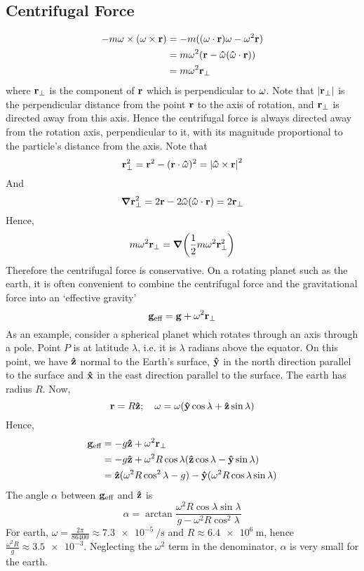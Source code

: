 \documentclass{article}
\begin{document}
\subsection{Centrifugal Force}
\begin{align*}
	-m\vb\omega \times (\vb\omega \times \vb r) & = -m((\vb\omega \cdot \vb r)\vb\omega - \vb\omega^2\vb r) \\
	                                            & = m\omega^2(\vb r - \vu\omega(\vu\omega \cdot \vb r))     \\
	                                            & = m\omega^2 \vb r_\perp
\end{align*}
where $\vb r_\perp$ is the component of $\vb r$ which is perpendicular to $\vb\omega$. Note that $\abs{\vb r_\perp}$ is the perpendicular distance from the point $\vb r$ to the axis of rotation, and $\vb r_\perp$ is directed away from this axis. Hence the centrifugal force is always directed away from the rotation axis, perpendicular to it, with its magnitude proportional to the particle's distance from the axis. Note that
\[ \vb r_\perp^2 = \vb r^2 - (\vb r \cdot \vu\omega)^2 = \abs{\vu\omega \times \vb r}^2 \]
And
\[ \grad \vb r_\perp^2 = 2\vb r - 2\vu\omega(\vu\omega \cdot \vb r) = 2\vb r_\perp \]
Hence,
\[ m\omega^2\vb r_\perp = \grad(\frac{1}{2}m\omega^2\vb r_\perp^2) \]
Therefore the centrifugal force is conservative. On a rotating planet such as the earth, it is often convenient to combine the centrifugal force and the gravitational force into an `effective gravity'
\[ \vb g_{\text{eff}} = \vb g + \omega^2 \vb r_\perp \]
As an example, consider a spherical planet which rotates through an axis through a pole. Point $P$ is at latitude $\lambda$, i.e. it is $\lambda$ radians above the equator. On this point, we have $\vu z$ normal to the Earth's surface, $\vu y$ in the north direction parallel to the surface and $\vu x$ in the east direction parallel to the surface. The earth has radius $R$. Now,
\[ \vb r = R\vu z;\quad \vb\omega = \omega(\vu y \cos\lambda + \vu z \sin\lambda) \]
Hence,
\begin{align*}
	\vb g_\text{eff} & = -g\vu z + \omega^2 \vb r_\perp                                              \\
	                 & = -g\vu z + \omega^2 R\cos\lambda (\vu z \cos\lambda - \vu y \sin\lambda)     \\
	                 & = \vu z(\omega^2 R\cos^2\lambda - g) - \vu y(\omega^2R\cos\lambda\sin\lambda)
\end{align*}
The angle $\alpha$ between $\vb g_\text{eff}$ and $\vu z$ is
\[ \alpha = \arctan \frac{\omega^2R\cos\lambda\sin\lambda}{g - \omega^2R\cos^2\lambda} \]
For earth, $\omega = \frac{2\pi}{86400} \approx \SI{7.3e-5}{\per\second}$ and $R \approx \SI{6.4e6}{\metre}$, hence $\frac{\omega^2R}{g} \approx \num{3.5e-3}$. Neglecting the $\omega^2$ term in the denominator, $\alpha$ is very small for the earth.
\end{document}
